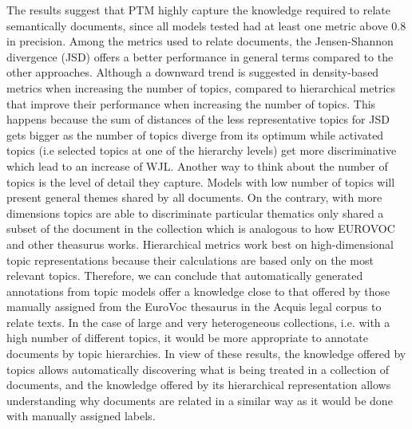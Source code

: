 The results suggest that PTM highly capture the knowledge required to relate semantically documents, since all models tested had at least one metric above 0.8 in precision. Among the metrics used to relate documents, the Jensen-Shannon divergence (JSD) offers a better performance in general terms compared to the other approaches. Although a downward trend is suggested in density-based metrics when increasing the number of topics, compared to hierarchical metrics that improve their performance when increasing the number of topics. This happens because the sum of distances of the less representative topics for JSD gets bigger as the number of topics diverge from its optimum while activated topics (i.e selected topics at one of the hierarchy levels) get more discriminative which lead to an increase of WJL. Another way to think about the number of topics is the level of detail they capture. Models with low number of topics will present general themes shared by all documents. On the contrary, with more dimensions topics are able to discriminate particular thematics only shared a subset of the document in the collection which is analogous to how EUROVOC and other theasurus works. Hierarchical metrics work best on high-dimensional topic representations because their calculations are based only on the most relevant topics. Therefore, we can conclude that automatically generated annotations from topic models offer a knowledge close to that offered by those manually assigned from the EuroVoc thesaurus in the Acquis legal corpus to relate texts. In the case of large and very heterogeneous collections, i.e. with a high number of different topics, it would be more appropriate to annotate documents by topic hierarchies. In view of these results, the knowledge offered by topics allows automatically discovering what is being treated in a collection of documents, and the knowledge offered by its hierarchical representation allows understanding why documents are related in a similar way as it would be done with manually assigned labels.

